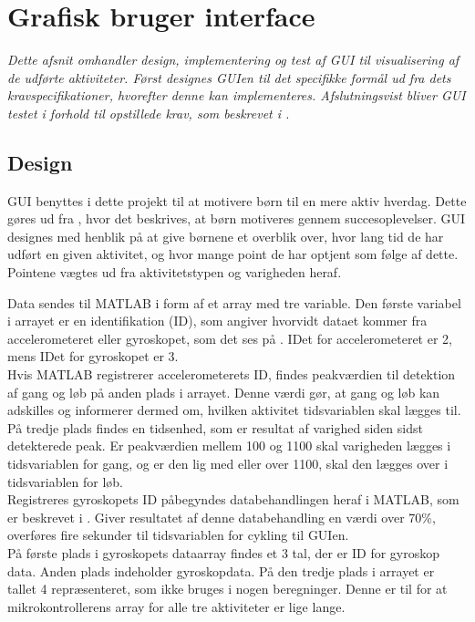 \section{Grafisk bruger interface}\label{GUI_design}
\textit{Dette afsnit omhandler design, implementering og test af GUI til visualisering af de udførte aktiviteter. Først designes GUIen til det specifikke formål ud fra dets kravspecifikationer, hvorefter denne kan implementeres. Afslutningsvist bliver GUI testet i forhold til opstillede krav, som beskrevet i .}

\subsection{Design}
GUI benyttes i dette projekt til at motivere børn til en mere aktiv hverdag. Dette gøres ud fra , hvor det beskrives, at børn motiveres gennem succesoplevelser. GUI designes med henblik på at give børnene et overblik over, hvor lang tid de har udført en given aktivitet, og hvor mange point de har optjent som følge af dette. Pointene vægtes ud fra aktivitetstypen og varigheden heraf. 

Data %
sendes til MATLAB i form af et array med tre variable. Den første variabel i arrayet er en identifikation (ID), som angiver hvorvidt dataet kommer fra accelerometeret eller gyroskopet, som det ses på . IDet for accelerometeret er 2, mens IDet for gyroskopet er 3.\\
Hvis MATLAB registrerer accelerometerets ID, findes peakværdien til detektion af gang og løb på anden plads i arrayet. Denne værdi gør, at gang og løb kan adskilles og informerer dermed om, hvilken aktivitet tidsvariablen skal lægges til. På tredje plads findes en tidsenhed, som er resultat af varighed siden sidst detekterede peak. Er peakværdien mellem 100 og 1100 skal varigheden lægges i tidsvariablen for gang, og er den lig med eller over 1100, skal den lægges over i tidsvariablen for løb.\\
Registreres gyroskopets ID påbegyndes databehandlingen heraf i MATLAB, som er beskrevet i . Giver resultatet af denne databehandling en værdi over 70\%, overføres fire sekunder til tidsvariablen for cykling til GUIen.\\ 
På første plads i gyroskopets dataarray findes et 3 tal, der er ID for gyroskop data. Anden plads indeholder gyroskopdata. På den tredje plads i arrayet er tallet 4 repræsenteret, som ikke bruges i nogen beregninger. Denne er til for at mikrokontrollerens array for alle tre aktiviteter er lige lange. 

